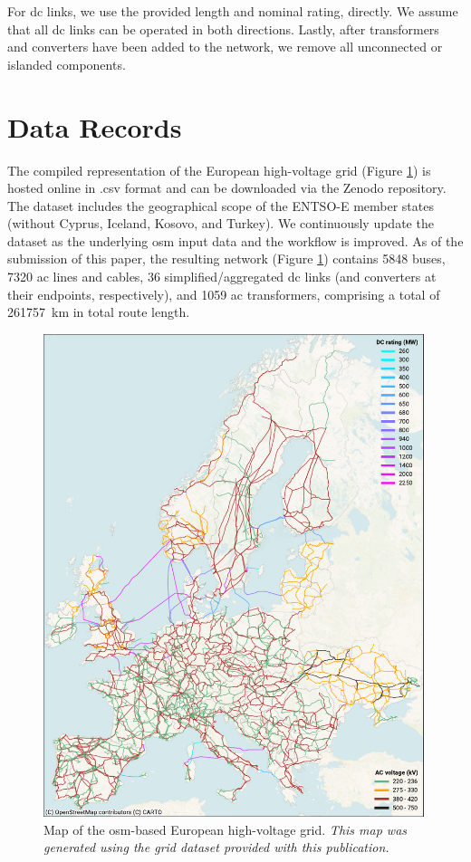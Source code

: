 \documentclass[fleqn,10pt]{wlscirep}
\let\autocite\cite
\begin{document}
For \acrshort{dc} links, we use the provided length and nominal rating, directly. We assume that all \acrshort{dc} links can be operated in both directions. Lastly, after transformers and converters have been added to the network, we remove all unconnected or islanded components. 

\section*{Data Records}
The compiled representation of the European high-voltage grid (Figure \ref{fig:osm_map}) is hosted online in .csv format and can be downloaded via the Zenodo repository.\autocite{xiongPrebuiltElectricityNetwork2024} The dataset includes the geographical scope of the ENTSO-E member states (without Cyprus, Iceland, Kosovo, and Turkey). 
We continuously update the dataset as the underlying \gls{osm} input data and the workflow is improved. As of the submission of this paper, the resulting network (Figure \ref{fig:osm_map}) contains 5848 buses, 7320 \acrshort{ac} lines and cables, 36 simplified/aggregated \acrshort{dc} links (and converters at their endpoints, respectively), and 1059 \acrshort{ac} transformers, comprising a total of \SI{261757}{\kilo\meter} in total route length.

\begin{figure}[!htbp]
    \centering
     \includegraphics[width=0.99\textwidth] {figures/fig_osm_map.pdf}
    \caption{Map of the \acrshort{osm}-based European high-voltage grid. \textit{This map was generated using the grid dataset provided with this publication. \autocite{xiongPrebuiltElectricityNetwork2024}}}
    \label{fig:osm_map}
\end{figure}
\end{document}
